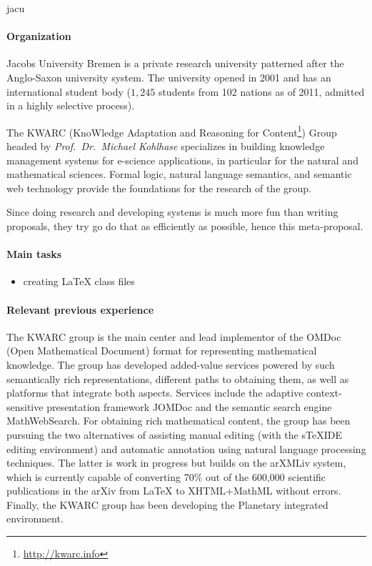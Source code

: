 \begin{sitedescription}{jacu}

\paragraph{Organization} Jacobs University Bremen is a private research university patterned
after the Anglo-Saxon university system.  The university opened in
2001 and has an international student body ($1,245$ students from 102
nations as of 2011, admitted in a highly selective process).

The KWARC (KnoWledge Adaptation and Reasoning for
Content\footnote{\url{http://kwarc.info}}) Group headed by
{\emph{Prof.\ Dr.\ Michael Kohlhase}} specializes in building
knowledge management systems for e-science applications, in particular
for the natural and mathematical sciences.  Formal logic, natural
language semantics, and semantic web technology provide the
foundations for the research of the group.
  
  Since doing research and developing systems is much more fun than writing proposals,
  they try go do that as efficiently as possible, hence this meta-proposal. 

\paragraph{Main tasks}

\begin{itemize}
\item creating {\LaTeX} class files
\end{itemize}

\paragraph{Relevant previous experience}

The KWARC group is the main center and lead implementor of the OMDoc
(Open Mathematical Document) format for representing mathematical
knowledge.  The group has developed added-value services powered by such semantically rich representations, different paths to obtaining them, as well as platforms that integrate both aspects.  Services include the adaptive context-sensitive presentation framework JOMDoc and the semantic search engine MathWebSearch.  For obtaining rich mathematical content, the group has been pursuing the two alternatives of assisting manual editing (with the sTeXIDE editing environment) and automatic annotation using natural language processing techniques.  The latter is work in progress but builds on the arXMLiv system, which is currently capable of converting 70\% out of the 600,000 scientific publications in the arXiv from {\LaTeX} to XHTML+MathML without errors.  Finally, the KWARC group has been developing the Planetary integrated environment.


\end{sitedescription}
